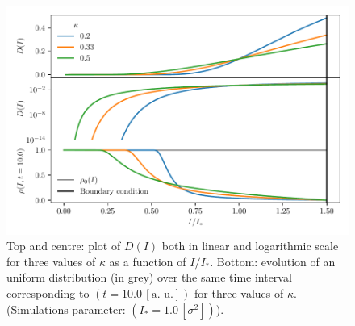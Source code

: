 \begin{figure}[htp]
    \centering
    \includegraphics[width=\textwidth]{4_probing_the_diffusive_behavior/figs/diffusion_coefficient.pdf}
    \caption{Top and centre: plot of $D(I)$ both in linear and logarithmic scale for three values of $\kappa$ as a function of $I/I_\ast$.
    Bottom: evolution of an uniform distribution (in grey) over the same time interval corresponding to $(t=10.0 \, [\text{a. u.}])$ for three values of $\kappa$. (Simulations parameter: $(I_\ast = 1.0\,[\sigma^2])$).}
    \label{fig:1}
\end{figure}

